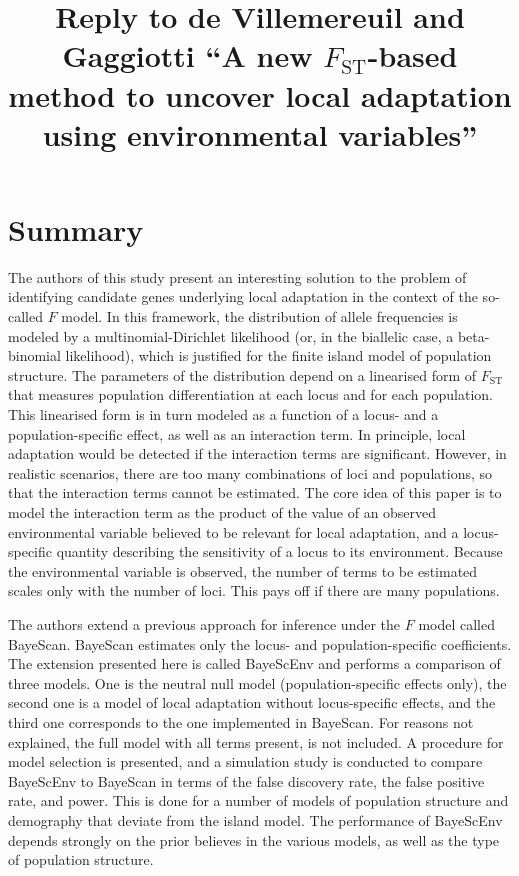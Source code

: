 \documentclass[11pt]{article}
\title{Reply to de Villemereuil and Gaggiotti ``A new $F_{\mathrm{ST}}$-based method to uncover local adaptation using environmental variables''}
\begin{document}
\maketitle

\section{Summary}
The authors of this study present an interesting solution to the problem of identifying candidate genes underlying local adaptation in the context of the so-called $F$ model. In this framework, the distribution of allele frequencies is modeled by a multinomial-Dirichlet likelihood (or, in the biallelic case, a beta-binomial likelihood), which is justified for the finite island model of population structure. The parameters of the distribution depend on a linearised form of $F_{\mathrm{ST}}$ that measures population differentiation at each locus and for each population. This linearised form is in turn modeled as a function of a locus- and a population-specific effect, as well as an interaction term. In principle, local adaptation would be detected if the interaction terms are significant. However, in realistic scenarios, there are too many combinations of loci and populations, so that the interaction terms cannot be estimated. The core idea of this paper is to model the interaction term as the product of the value of an observed environmental variable believed to be relevant for local adaptation, and a locus-specific quantity describing the sensitivity of a locus to its environment. Because the environmental variable is observed, the number of terms to be estimated scales only with the number of loci. This pays off if there are many populations. 

The authors extend a previous approach for inference under the $F$ model called BayeScan. BayeScan estimates only the locus- and population-specific coefficients. The extension presented here is called BayeScEnv and performs a comparison of three models. One is the neutral null model (population-specific effects only), the second one is a model of local adaptation without locus-specific effects, and the third one corresponds to the one implemented in BayeScan. For reasons not explained, the full model with all terms present, is not included. A procedure for model selection is presented, and a simulation study is conducted to compare BayeScEnv to BayeScan in terms of the false discovery rate, the false positive rate, and power. This is done for a number of models of population structure and demography that deviate from the island model. The performance of BayeScEnv depends strongly on the prior believes in the various models, as well as the type of population structure.
\end{document}
